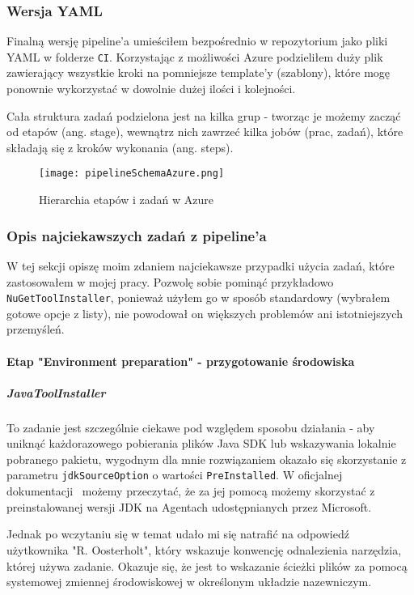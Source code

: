 \subsubsection{Wersja YAML}
Finalną wersję pipeline'a umieściłem bezpośrednio w repozytorium jako pliki YAML w folderze \verb|CI|.
Korzystając z możliwości Azure podzieliłem duży plik zawierający wszystkie kroki 
na pomniejsze template'y (szablony), które mogę ponownie wykorzystać w dowolnie dużej 
ilości i kolejności.

Cała struktura zadań podzielona jest na kilka grup - tworząc je możemy zacząć od etapów (ang. stage), 
wewnątrz nich zawrzeć kilka jobów (prac, zadań), które składają się z kroków wykonania (ang. steps).


\begin{figure}[ht]
    \texttt{[image: pipelineSchemaAzure.png]}
    \caption{Hierarchia etapów i zadań w Azure~\cite{pipelineSchemaAzure_source}}
    \label{img:pipelineSchemaAzure}
    
\end{figure}

\subsubsection{Opis najciekawszych zadań z pipeline'a}

W tej sekcji opiszę moim zdaniem najciekawsze przypadki użycia zadań, które zastosowałem 
w mojej pracy. Pozwolę sobie pominąć przykładowo \verb|NuGetToolInstaller|, ponieważ użyłem 
go w sposób standardowy (wybrałem gotowe opcje z listy), nie powodował on większych problemów
ani istotniejszych przemyśleń.

\paragraph{Etap "Environment preparation" - przygotowanie środowiska}

\subparagraph{JavaToolInstaller} \label{javaTask}
To zadanie jest szczególnie ciekawe pod względem sposobu działania - aby uniknąć każdorazowego 
pobierania plików Java SDK lub wskazywania lokalnie pobranego pakietu, wygodnym dla mnie 
rozwiązaniem okazało się skorzystanie z parametru \verb|jdkSourceOption| o wartości \verb|PreInstalled|.
W oficjalnej dokumentacji~\cite{jdkSourceOption} możemy przeczytać, że za jej pomocą możemy skorzystać 
z preinstalowanej wersji JDK na Agentach udostępnianych przez Microsoft.

Jednak po wczytaniu się w temat udało mi się natrafić na odpowiedź~\cite{javaToolInstaller_StackOverflow} 
użytkownika "R. Oosterholt", który wskazuje konwencję odnalezienia narzędzia, której używa zadanie.
Okazuje się, że jest to wskazanie ścieżki plików za pomocą systemowej zmiennej środowiskowej w określonym 
układzie nazewniczym.

